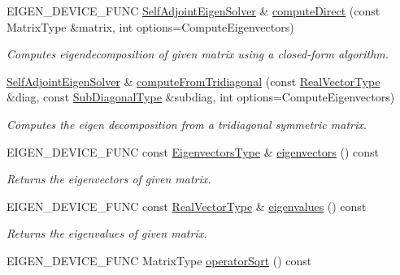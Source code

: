 \begin{DoxyCompactItemize}
E\+I\+G\+E\+N\+\_\+\+D\+E\+V\+I\+C\+E\+\_\+\+F\+U\+NC \mbox{\hyperlink{class_eigen_1_1_self_adjoint_eigen_solver}{Self\+Adjoint\+Eigen\+Solver}} \& \mbox{\hyperlink{class_eigen_1_1_self_adjoint_eigen_solver_a40b0a68841d6176b1ab98743cc82bef4}{compute\+Direct}} (const Matrix\+Type \&matrix, int options=Compute\+Eigenvectors)
\begin{DoxyCompactList}\small\item\em Computes eigendecomposition of given matrix using a closed-\/form algorithm. \end{DoxyCompactList}\item 
\mbox{\hyperlink{class_eigen_1_1_self_adjoint_eigen_solver}{Self\+Adjoint\+Eigen\+Solver}} \& \mbox{\hyperlink{class_eigen_1_1_self_adjoint_eigen_solver_a297893df7098c43278d385e4d4e23fe4}{compute\+From\+Tridiagonal}} (const \mbox{\hyperlink{class_eigen_1_1_self_adjoint_eigen_solver_acd090d5fdfc3cc017a13b6d8daa92287}{Real\+Vector\+Type}} \&diag, const \mbox{\hyperlink{class_eigen_1_1_matrix}{Sub\+Diagonal\+Type}} \&subdiag, int options=Compute\+Eigenvectors)
\begin{DoxyCompactList}\small\item\em Computes the eigen decomposition from a tridiagonal symmetric matrix. \end{DoxyCompactList}\item 
E\+I\+G\+E\+N\+\_\+\+D\+E\+V\+I\+C\+E\+\_\+\+F\+U\+NC const \mbox{\hyperlink{class_eigen_1_1_matrix}{Eigenvectors\+Type}} \& \mbox{\hyperlink{class_eigen_1_1_self_adjoint_eigen_solver_a7b9f7e641fa46ac4c5f2371405c69b2b}{eigenvectors}} () const
\begin{DoxyCompactList}\small\item\em Returns the eigenvectors of given matrix. \end{DoxyCompactList}\item 
E\+I\+G\+E\+N\+\_\+\+D\+E\+V\+I\+C\+E\+\_\+\+F\+U\+NC const \mbox{\hyperlink{class_eigen_1_1_self_adjoint_eigen_solver_acd090d5fdfc3cc017a13b6d8daa92287}{Real\+Vector\+Type}} \& \mbox{\hyperlink{class_eigen_1_1_self_adjoint_eigen_solver_a8efab27e82aa6aa0ae0c64739238c2e0}{eigenvalues}} () const
\begin{DoxyCompactList}\small\item\em Returns the eigenvalues of given matrix. \end{DoxyCompactList}\item 
E\+I\+G\+E\+N\+\_\+\+D\+E\+V\+I\+C\+E\+\_\+\+F\+U\+NC Matrix\+Type \mbox{\hyperlink{class_eigen_1_1_self_adjoint_eigen_solver_a5c5158fd86366081bdabec38112c2c8a}{operator\+Sqrt}} () const

\end{DoxyCompactItemize}
